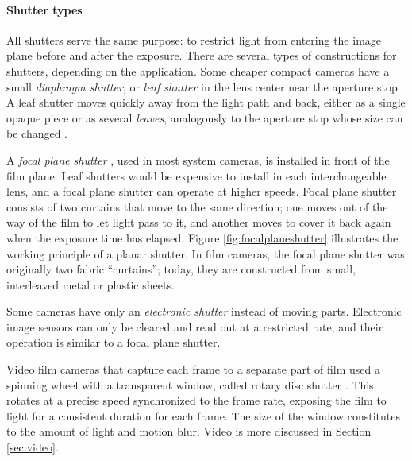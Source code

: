 

\paragraph{Shutter types}
All shutters serve the same purpose: to restrict light from entering the image plane before and after the exposure.
There are several types of constructions for shutters, depending on the application.
Some cheaper compact cameras have a small \emph{diaphragm shutter}, or \emph{leaf shutter} in the lens center near the aperture stop.
A leaf shutter moves quickly away from the light path and back, either as a single opaque piece or as several \emph{leaves}, analogously to the aperture stop whose size can be changed \cite[p.~117]{greenleaf1950photographic}.

A \emph{focal plane shutter} \cite[p.~123]{greenleaf1950photographic}, used in most system cameras, is installed in front of the film plane.
Leaf shutters would be expensive to install in each interchangeable lens, and a focal plane shutter can operate at higher speeds.
Focal plane shutter consists of two curtains that move to the same direction; one moves out of the way of the film to let light pass to it, and another moves to cover it back again when the exposure time has elapsed.
Figure \ref{fig:focalplaneshutter} illustrates the working principle of a planar shutter.
In film cameras, the focal plane shutter was originally two fabric ``curtains'';
today, they are constructed from small, interleaved metal or plastic sheets.

Some cameras have only an \emph{electronic shutter} instead of moving parts.
Electronic image sensors can only be cleared and read out at a restricted rate, and their operation is similar to a focal plane shutter.
\cite{caspeelectronic,kodakshutter}

Video film cameras that capture each frame to a separate part of film used a spinning wheel with a transparent window, called rotary disc shutter \cite{wilson2004anton}.
This rotates at a precise speed synchronized to the frame rate, exposing the film to light for a consistent duration for each frame.
The size of the window constitutes to the amount of light and motion blur.
Video is more discussed in Section \ref{sec:video}.

